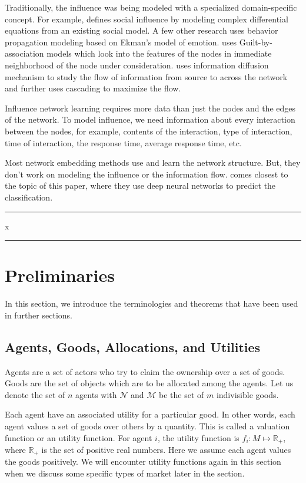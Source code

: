 Traditionally, the influence was being modeled with a specialized domain-specific concept. For example, \cite{matsubara2012rise} defines social influence by modeling complex differential equations from an existing social model. A few other research uses behavior propagation modeling based on Ekman's model of emotion. \cite{wang2017gang} uses Guilt-by-association models which look into the features of the nodes in immediate neighborhood of the node under consideration. \cite{kempe2003maximizing} uses information diffusion mechanism to study the flow of information from source to across the network and further uses cascading to maximize the flow.

Influence network learning requires more data than just the nodes and the edges of the network. To model influence, we need information about every interaction between the nodes, for example, contents of the interaction, type of interaction, time of interaction, the response time, average response time, etc.

Most network embedding methods use and learn the network structure. But, they don't work on modeling the influence or the information flow. \cite{qiu2018deepinf} comes closest to the topic of this paper, where they use deep neural networks to predict the classification.

\hrule
x
\hrule

\section{Preliminaries}
In this section, we introduce the terminologies and theorems that have been used in further sections.

\subsection{Agents, Goods, Allocations, and Utilities}
Agents are a set of actors who try to claim the ownership over a set of goods. Goods are the set of objects which are to be allocated among the agents. Let us denote the set of $\mathit{n}$ agents with $\mathcal{N}$ and $\mathcal{M}$ be the set of $\mathit{m}$ indivisible goods.

Each agent have an associated utility for a particular good. In other words, each agent values a set of goods over others by a quantity. This is called a valuation function or an utility function. For agent $i$, the utility function is $f_i: M\mapsto \mathbb{R_+}$, where $\mathbb{R_+}$ is the set of positive real numbers. Here we assume each agent values the goods positively. We will encounter utility functions again in this section when we discuss some specific types of market later in the section.

